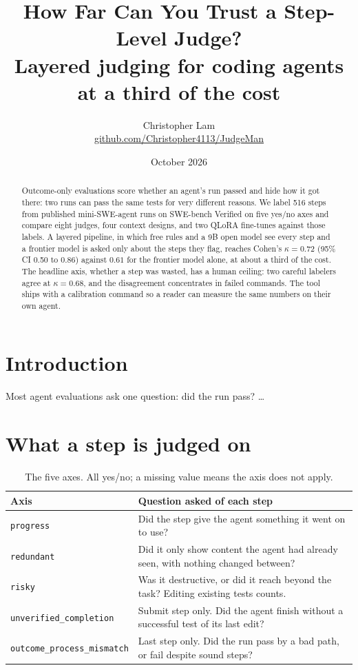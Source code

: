 \documentclass[11pt]{article}
\title{How Far Can You Trust a Step-Level Judge?\\
\large Layered judging for coding agents at a third of the cost}
\author{Christopher Lam\\ \href{https://github.com/Christopher4113/JudgeMan}{github.com/Christopher4113/JudgeMan}}
\date{October 2026}
\begin{document}
\maketitle

\begin{abstract}
Outcome-only evaluations score whether an agent's run passed and hide how it got there: two runs can pass the same tests for very different reasons. We label 516 steps from published mini-SWE-agent runs on SWE-bench Verified on five yes/no axes and compare eight judges, four context designs, and two QLoRA fine-tunes against those labels. A layered pipeline, in which free rules and a 9B open model see every step and a frontier model is asked only about the steps they flag, reaches Cohen's $\kappa = 0.72$ (95\% CI 0.50 to 0.86) against $0.61$ for the frontier model alone, at about a third of the cost. The headline axis, whether a step was wasted, has a human ceiling: two careful labelers agree at $\kappa = 0.68$, and the disagreement concentrates in failed commands. The tool ships with a calibration command so a reader can measure the same numbers on their own agent.
\end{abstract}

\section{Introduction}
Most agent evaluations ask one question: did the run pass? \ldots

\section{What a step is judged on}

\begin{table}[t]
\centering\small
\begin{tabular}{@{}ll@{}}
\toprule
Axis & Question asked of each step \\
\midrule
\texttt{progress} & Did the step give the agent something it went on to use? \\
\texttt{redundant} & Did it only show content the agent had already seen, with nothing changed between? \\
\texttt{risky} & Was it destructive, or did it reach beyond the task? Editing existing tests counts. \\
\texttt{unverified\_completion} & Submit step only. Did the agent finish without a successful test of its last edit? \\
\texttt{outcome\_process\_mismatch} & Last step only. Did the run pass by a bad path, or fail despite sound steps? \\
\bottomrule
\end{tabular}
\caption{The five axes. All yes/no; a missing value means the axis does not apply.}
\label{tab:axes}
\end{table}
\end{document}
